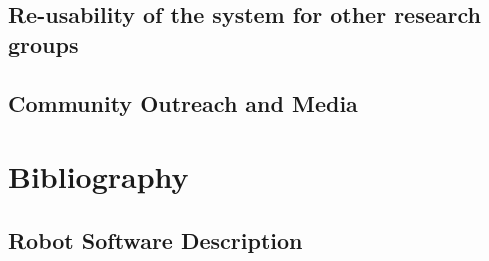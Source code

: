 \documentclass[runningheads,a4paper]{llncs}
\begin{document}
\subsection{Re-usability of the system for other research groups}


\subsection{Community Outreach and Media}




\section*{Bibliography}




%
\robospecs


\newpage
\subsection{Robot Software Description}

%
\nocite{*}
\end{document}
